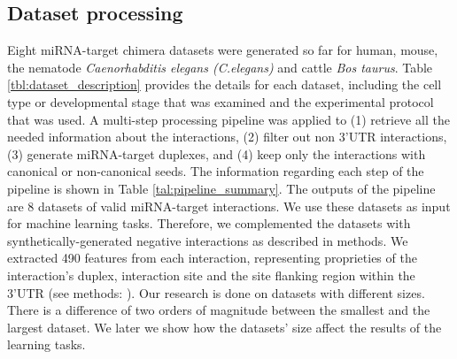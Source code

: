 \documentclass{bmcart}
\begin{document}
\subsection*{Dataset processing}
Eight miRNA-target chimera datasets were generated so far for human, mouse, the nematode \textit{Caenorhabditis elegans (C.elegans)} and cattle \textit{Bos taurus}. Table \ref{tbl:dataset_description} provides the details for each dataset, including the cell type or developmental stage that was examined and the experimental protocol that was used. A multi-step processing pipeline was applied to (1) retrieve all the needed information about the interactions, (2) filter out non 3'UTR interactions, (3) generate miRNA-target duplexes, and (4) keep only the interactions with canonical or non-canonical seeds. The information regarding each step of the pipeline is shown in Table \ref{tal:pipeline_summary}. The outputs of the pipeline are 8 datasets of valid miRNA-target interactions. We use these datasets as input for machine learning tasks. Therefore, we complemented the datasets with synthetically-generated negative interactions as described in methods. We extracted 490 features from each interaction, representing proprieties of the interaction's duplex, interaction site and the site flanking region within the 3'UTR (see methods: ).
Our research is done on datasets with different sizes. There is a difference of two orders of magnitude between the smallest and the largest dataset. We later we show how the datasets' size affect the results of the learning tasks.\\
\end{document}
